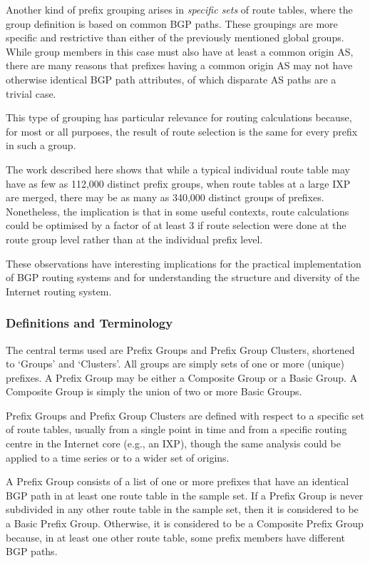 Another kind of prefix grouping arises in \emph{specific sets} of route tables, where the group definition is based on common BGP paths. These groupings are more specific and restrictive than either of the previously mentioned global groups. While group members in this case must also have at least a common origin AS, there are many reasons that prefixes having a common origin AS may not have otherwise identical BGP path attributes, of which disparate AS paths are a trivial case.

This type of grouping has particular relevance for routing calculations because, for most or all purposes, the result of route selection is the same for every prefix in such a group.

The work described here shows that while a typical individual route table may have as few as 112,000 distinct prefix groups, when route tables at a large IXP are merged, there may be as many as 340,000 distinct groups of prefixes. Nonetheless, the implication is that in some useful contexts, route calculations could be optimised by a factor of at least 3 if route selection were done at the route group level rather than at the individual prefix level.

These observations have interesting implications for the practical implementation of BGP routing systems and for understanding the structure and diversity of the Internet routing system.

\subsubsection{Definitions and Terminology}

The central terms used are Prefix Groups and Prefix Group Clusters, shortened to `Groups' and `Clusters'. All groups are simply sets of one or more (unique) prefixes. A Prefix Group may be either a Composite Group or a Basic Group. A Composite Group is simply the union of two or more Basic Groups.

Prefix Groups and Prefix Group Clusters are defined with respect to a specific set of route tables, usually from a single point in time and from a specific routing centre in the Internet core (e.g., an IXP), though the same analysis could be applied to a time series or to a wider set of origins.

A Prefix Group consists of a list of one or more prefixes that have an identical BGP path in at least one route table in the sample set. If a Prefix Group is never subdivided in any other route table in the sample set, then it is considered to be a Basic Prefix Group. Otherwise, it is considered to be a Composite Prefix Group because, in at least one other route table, some prefix members have different BGP paths.

